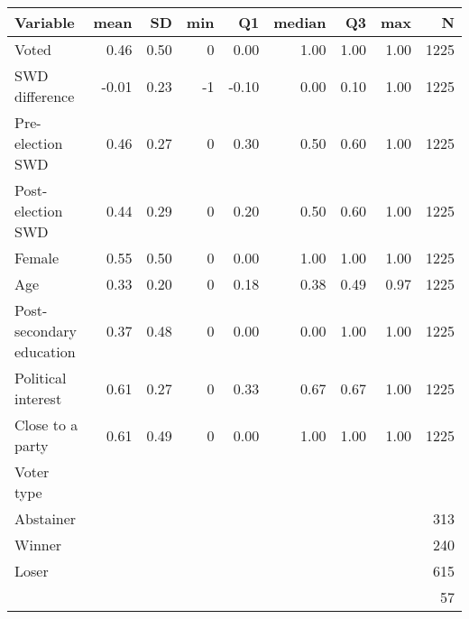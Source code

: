 
\begin{tabular}{l|r|r|r|r|r|r|r|r}
\hline
Variable & mean & SD & min & Q1 & median & Q3 & max & N\\
\hline
Voted & 0.46 & 0.50 & 0 & 0.00 & 1.00 & 1.00 & 1.00 & 1225\\
\hline
SWD difference & -0.01 & 0.23 & -1 & -0.10 & 0.00 & 0.10 & 1.00 & 1225\\
\hline
Pre-election SWD & 0.46 & 0.27 & 0 & 0.30 & 0.50 & 0.60 & 1.00 & 1225\\
\hline
Post-election SWD & 0.44 & 0.29 & 0 & 0.20 & 0.50 & 0.60 & 1.00 & 1225\\
\hline
Female & 0.55 & 0.50 & 0 & 0.00 & 1.00 & 1.00 & 1.00 & 1225\\
\hline
Age & 0.33 & 0.20 & 0 & 0.18 & 0.38 & 0.49 & 0.97 & 1225\\
\hline
Post-secondary education & 0.37 & 0.48 & 0 & 0.00 & 0.00 & 1.00 & 1.00 & 1225\\
\hline
Political interest & 0.61 & 0.27 & 0 & 0.33 & 0.67 & 0.67 & 1.00 & 1225\\
\hline
Close to a party & 0.61 & 0.49 & 0 & 0.00 & 1.00 & 1.00 & 1.00 & 1225\\
\hline
Voter type &  &  &  &  &  &  &  & \\
\hline
Abstainer &  &  &  &  &  &  &  & 313\\
\hline
Winner &  &  &  &  &  &  &  & 240\\
\hline
Loser &  &  &  &  &  &  &  & 615\\
\hline
 &  &  &  &  &  &  &  & 57\\
\hline
\end{tabular}
